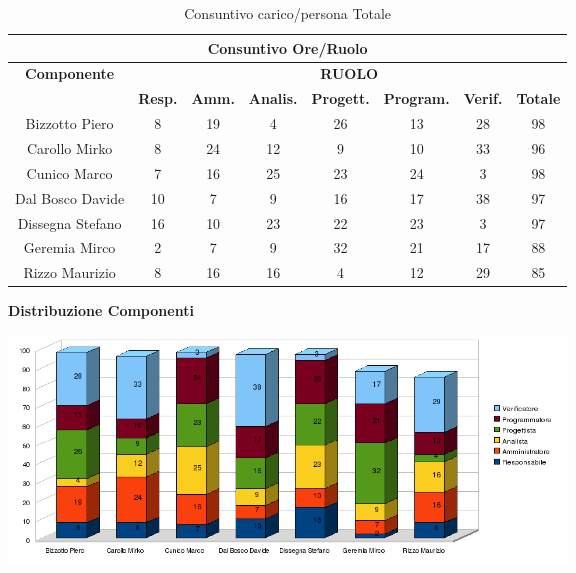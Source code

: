 \newpage
\begin{table}[!h]
	\begin{center}
		  \begin{tabular}
			  {|c|c|c|c|c|c|c|c|}
		 \hline
			\multicolumn{8}{|c|}{ \textbf{Consuntivo Ore/Ruolo} } \\
			\hline
			\textbf{Componente} & \multicolumn{7}{|c|}{ \textbf{RUOLO} } \\
			\hline
			& \textbf{Resp.} & \textbf{Amm.} & \textbf{Analis.} & \textbf{Progett.} & \textbf{Program.} & \textbf{Verif.}  & \textbf{Totale}\\
			\hline
			Bizzotto Piero 		&  8  &  19  &  4  &  26  &  13 &  28 &  98 \\ %
			\hline
			Carollo Mirko 		&  8  &  24  &  12 &  9  &  10 &  33 &  96\\ %
			\hline
			Cunico Marco    	&  7  &  16 &  25  &  23 &  24 &  3  &  98\\ %
			\hline
			Dal Bosco Davide   	&  10  &  7  &  9  &  16 &  17 &  38 &  97\\ %
			\hline
			Dissegna Stefano    &  16  &  10 &  23  &  22 &  23 &  3  &  97\\ %
			\hline
			Geremia Mirco   	&  2  &  7  &  9  &  32 &  21 &  17  &  88\\ %
			\hline	
			Rizzo Maurizio  	&  8  &  16 &  16  &  4  &  12 &  29  &  85\\ %
			\hline	
		\end{tabular}
	\caption{Consuntivo carico/persona Totale} %
	\label{tab: ConsPersOre_Totale}
	\end{center}	
\end{table}

\begin{center}\textbf{Distribuzione Componenti}
\end{center}
\includegraphics[width=420pt]{Cons}

